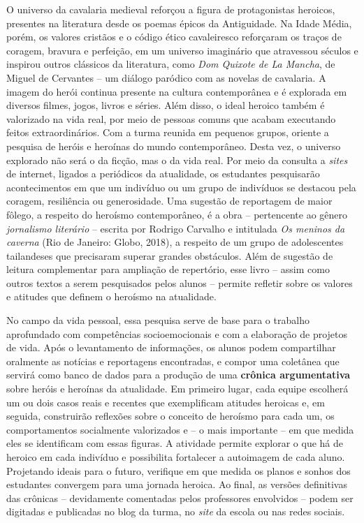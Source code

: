 \documentclass[11pt]{extarticle}
\begin{document}
  O universo da cavalaria medieval reforçou a figura de protagonistas
  heroicos, presentes na literatura desde os poemas épicos da
  Antiguidade. Na Idade Média, porém, os valores cristãos e o código
  ético cavaleiresco reforçaram os traços de coragem, bravura e
  perfeição, em um universo imaginário que atravessou séculos e inspirou
  outros clássicos da literatura, como \emph{Dom Quixote de La Mancha},
  de Miguel de Cervantes -- um diálogo paródico com as novelas de
  cavalaria. A imagem do herói continua presente na cultura
  contemporânea e é explorada em diversos filmes, jogos, livros e
  séries. Além disso, o ideal heroico também é valorizado na vida real,
  por meio de pessoas comuns que acabam executando feitos
  extraordinários. Com a turma reunida em pequenos grupos, oriente a
  pesquisa de heróis e heroínas do mundo contemporâneo. Desta vez, o
  universo explorado não será o da ficção, mas o da vida real. Por meio
  da consulta a \emph{sites} de internet, ligados a periódicos da
  atualidade, os estudantes pesquisarão acontecimentos em que um
  indivíduo ou um grupo de indivíduos se destacou pela coragem,
  resiliência ou generosidade. Uma sugestão de reportagem de maior
  fôlego, a respeito do heroísmo contemporâneo, é a obra -- pertencente
  ao gênero \emph{jornalismo literário} -- escrita por Rodrigo Carvalho
  e intitulada \emph{Os meninos da caverna} (Rio de Janeiro: Globo,
  2018), a respeito de um grupo de adolescentes tailandeses que
  precisaram superar grandes obstáculos. Além de sugestão de leitura
  complementar para ampliação de repertório, esse livro -- assim como
  outros textos a serem pesquisados pelos alunos -- permite refletir
  sobre os valores e atitudes que definem o heroísmo na atualidade.

No campo da vida pessoal, essa pesquisa serve de base para o trabalho
aprofundado com competências socioemocionais e com a elaboração de
projetos de vida. Após o levantamento de informações, os alunos podem
compartilhar oralmente as notícias e reportagens encontradas, e compor
uma coletânea que servirá como banco de dados para a produção de uma
\textbf{crônica argumentativa} sobre heróis e heroínas da atualidade. Em
primeiro lugar, cada equipe escolherá um ou dois casos reais e recentes
que exemplificam atitudes heroicas e, em seguida, construirão reflexões
sobre o conceito de heroísmo para cada um, os comportamentos socialmente
valorizados e -- o mais importante -- em que medida eles se identificam
com essas figuras. A atividade permite explorar o que há de heroico em
cada indivíduo e possibilita fortalecer a autoimagem de cada aluno.
Projetando ideais para o futuro, verifique em que medida os planos e
sonhos dos estudantes convergem para uma jornada heroica. Ao final, as
versões definitivas das crônicas -- devidamente comentadas pelos
professores envolvidos -- podem ser digitadas e publicadas no blog da
turma, no \emph{site} da escola ou nas redes sociais.
\end{document}
